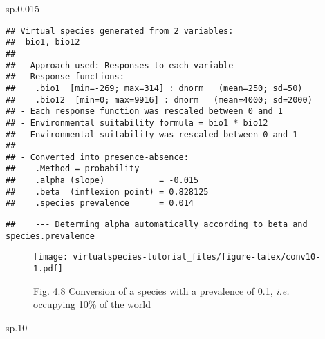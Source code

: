 \documentclass[]{article}
\newenvironment{Shaded}{\begin{snugshade}}{\end{snugshade}}
\newcommand{\KeywordTok}[1]{\textcolor[rgb]{0.13,0.29,0.53}{\textbf{#1}}}
\newcommand{\DataTypeTok}[1]{\textcolor[rgb]{0.13,0.29,0.53}{#1}}
\newcommand{\DecValTok}[1]{\textcolor[rgb]{0.00,0.00,0.81}{#1}}
\newcommand{\FloatTok}[1]{\textcolor[rgb]{0.00,0.00,0.81}{#1}}
\newcommand{\StringTok}[1]{\textcolor[rgb]{0.31,0.60,0.02}{#1}}
\newcommand{\CommentTok}[1]{\textcolor[rgb]{0.56,0.35,0.01}{\textit{#1}}}
\newcommand{\OtherTok}[1]{\textcolor[rgb]{0.56,0.35,0.01}{#1}}
\newcommand{\NormalTok}[1]{#1}
\begin{document}
\begin{Shaded}
\begin{Highlighting}[]
\NormalTok{sp.}\FloatTok{0.015}
\end{Highlighting}
\end{Shaded}

\begin{verbatim}
## Virtual species generated from 2 variables:
##  bio1, bio12
## 
## - Approach used: Responses to each variable
## - Response functions:
##    .bio1  [min=-269; max=314] : dnorm   (mean=250; sd=50)
##    .bio12  [min=0; max=9916] : dnorm   (mean=4000; sd=2000)
## - Each response function was rescaled between 0 and 1
## - Environmental suitability formula = bio1 * bio12
## - Environmental suitability was rescaled between 0 and 1
## 
## - Converted into presence-absence:
##    .Method = probability
##    .alpha (slope)           = -0.015
##    .beta  (inflexion point) = 0.828125
##    .species prevalence      = 0.014
\end{verbatim}

\begin{Shaded}
\end{Shaded}

\begin{verbatim}
##    --- Determing alpha automatically according to beta and species.prevalence
\end{verbatim}

\begin{figure}
\centering
\texttt{[image: virtualspecies-tutorial\_files/figure-latex/conv10-1.pdf]}
\caption{Fig. 4.8 Conversion of a species with a prevalence of 0.1,
\emph{i.e.} occupying 10\% of the world}
\end{figure}

\begin{Shaded}
\begin{Highlighting}[]
\NormalTok{sp.}\DecValTok{10}
\end{Highlighting}
\end{Shaded}
\end{document}
